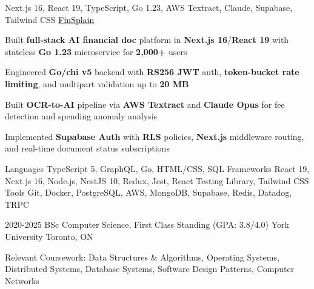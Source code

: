 \documentclass[11pt, a4paper]{awesome-cv}
\begin{document}
\begin{cventries}
\end{cventries}


\begin{cventries}

  \cventry
  {Next.js 16, React 19, TypeScript, Go 1.23, AWS Textract, Claude, Supabase, Tailwind CSS}
  {\href{https://finsplain.net}{\textcolor{black}{\underline{FinSplain}} \faExternalLink}}
  {}
  {}
  {
    \begin{cvitems}
      \item {Built \textbf{full-stack AI financial doc} platform in \textbf{Next.js 16}/\textbf{React 19} with stateless \textbf{Go 1.23} microservice for \textbf{2,000+} users}
      \item {Engineered \textbf{Go/chi v5} backend with \textbf{RS256 JWT} auth, \textbf{token-bucket rate limiting}, and multipart validation up to \textbf{20 MB}}
      \item {Built \textbf{OCR-to-AI} pipeline via \textbf{AWS Textract} and \textbf{Claude Opus} for fee detection and spending anomaly analysis}
      \item {Implemented \textbf{Supabase Auth} with \textbf{RLS} policies, \textbf{Next.js} middleware routing, and real-time document status subscriptions}
    \end{cvitems}
  }

\end{cventries}


\begin{cvskills}
  \cvskill
  {Languages}
  {TypeScript 5, GraphQL, Go, HTML/CSS, SQL}
  \cvskill
  {Frameworks}
  {React 19, Next.js 16, Node.js, NestJS 10, Redux, Jest, React Testing Library, Tailwind CSS}
  \cvskill
  {Tools}
  {Git, Docker, PostgreSQL, AWS, MongoDB, Supabase, Redis, Datadog, TRPC}
\end{cvskills}

\vspace{-2mm}

\begin{cventries}
  \cventry
  {2020-2025}
  {BSc Computer Science, First Class Standing (GPA: 3.8/4.0)}
  {York University}
  {Toronto, ON}
  {%
    \begin{cvitems}
      \item {Relevant Coursework: Data Structures \& Algorithms, Operating Systems, Distributed Systems, Database Systems, Software Design Patterns, Computer Networks}
    \end{cvitems}
  }
\end{cventries}

\end{document}
